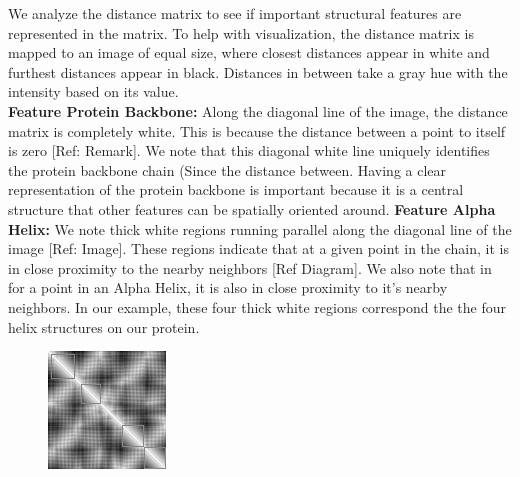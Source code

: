 \documentclass[12pt, a4paper, twocolumn, fullpage]{article}
\theoremstyle{plain}
\theoremstyle{definition}
\theoremstyle{remark}
\begin{document}
We analyze the distance matrix to see if important structural features are represented in the matrix. To help with visualization, the distance matrix is mapped to an image of equal size, where closest distances appear in white and furthest distances appear in black. Distances in between take a gray hue with the intensity based on its value.
\\
\textbf{Feature Protein Backbone:}
Along the diagonal line of the image, the distance matrix is completely white. This is because the distance between a point to itself is zero [Ref: Remark]. We note that this diagonal white line uniquely identifies the protein backbone chain (Since the distance between. Having a clear representation of the protein backbone is important because  it is a central structure that other features can be spatially oriented around.
\noindent
\textbf{Feature Alpha Helix:}
We note thick white regions running parallel along the diagonal line of the image [Ref: Image]. These regions indicate that at a given point in the chain, it is in close proximity to the nearby neighbors [Ref Diagram]. We also note that in for a point in an Alpha Helix, it is also in close proximity to it's nearby neighbors. In our example, these four thick white regions correspond the the four helix structures on our protein.
	
\begin{figure}[h]
	\centering
	\includegraphics[width=.7\linewidth]{1ux8matAhelix}
	\caption{}
	\label{fig:network}
\end{figure}
\end{document}
